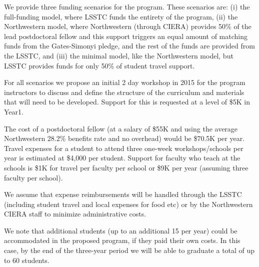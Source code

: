 \documentclass[nofootbib,floatfix,11pt]{article}
\begin{document}
We provide three funding scenarios for the program. These scenarios are: (i) the full-funding model, where LSSTC funds the entirety of the  program, (ii) the Northwestern model, where Northwestern (through CIERA) provides 50\% of the lead postdoctoral fellow and this support triggers an equal amount of matching funds from the Gates-Simonyi pledge, and the rest of the funds are provided from the LSSTC, and (iii) the minimal model, like the Northwestern model, but LSSTC provides funds for only 50\% of student travel support. 

For all scenarios we propose an initial 2 day workshop in 2015 for the program instructors to discuss and define the structure of the curriculum and materials that will need to be developed. Support for this is requested at a level of \$5K in Year1.

The cost of a postdoctoral fellow (at a salary of \$55K and using the average Northwestern 28.2\% benefits rate and no overhead) would be \$70.5K per year. Travel expenses for a student to attend three one-week workshops/schools per year is estimated at \$4,000 per student. Support for faculty who teach at the schools is \$1K for travel per faculty per school or \$9K per year (assuming three faculty per school).

We assume that expense reimbursements will be handled through the LSSTC (including student travel and local expenses for food etc) or by the Northwestern CIERA staff to minimize administrative costs.

We note that additional students (up to an additional 15 per year) could be accommodated in the proposed program, if they paid their own costs. In this case, by the end of the three-year period we will be able to graduate a total of up to 60 students. 

\end{document}
